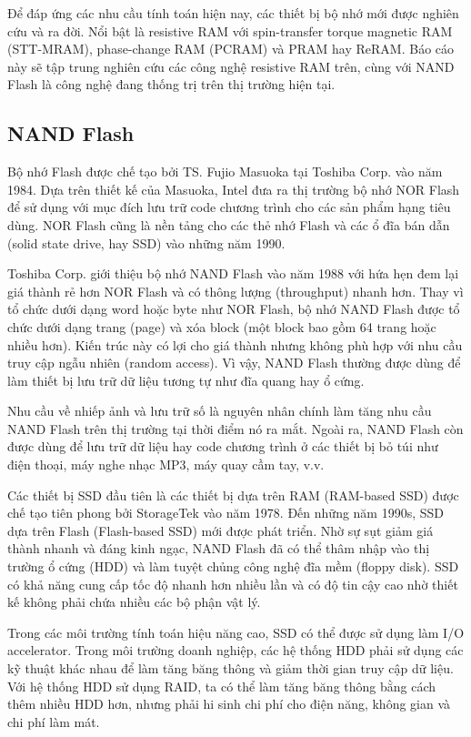 Để đáp ứng các nhu cầu tính toán hiện nay, các thiết bị bộ nhớ mới được nghiên
cứu và ra đời. Nổi bật là resistive RAM với spin-transfer torque magnetic RAM
(STT-MRAM), phase-change RAM (PCRAM) và PRAM hay ReRAM. Báo cáo này sẽ tập
trung nghiên cứu các công nghệ resistive RAM trên, cùng với NAND Flash là công
nghệ đang thống trị trên thị trường hiện tại.

\subsection{NAND Flash}
Bộ nhớ Flash được chế tạo bởi TS. Fujio Masuoka tại Toshiba Corp. vào năm 1984.
Dựa trên thiết kế của Masuoka, Intel đưa ra thị trường bộ nhớ NOR Flash để sử
dụng với mục đích lưu trữ code chương trình cho các sản phẩm hạng tiêu dùng.
NOR Flash cũng là nền tảng cho các thẻ nhớ Flash và các ổ đĩa bán dẫn (solid
state drive, hay SSD) vào những năm 1990.

Toshiba Corp. giới thiệu bộ nhớ NAND Flash vào năm 1988 với hứa hẹn đem lại giá
thành rẻ hơn NOR Flash và có thông lượng (throughput) nhanh hơn. Thay vì tổ
chức dưới dạng word hoặc byte như NOR Flash, bộ nhớ NAND Flash được tổ chức
dưới dạng trang (page) và xóa block (một block bao gồm 64 trang hoặc nhiều
hơn). Kiến trúc này có lợi cho giá thành nhưng không phù hợp với nhu cầu truy
cập ngẫu nhiên (random access). Vì vậy, NAND Flash thường được dùng để làm
thiết bị lưu trữ dữ liệu tương tự như đĩa quang hay ổ cứng.


Nhu cầu về nhiếp ảnh và lưu trữ số là nguyên nhân chính làm tăng nhu cầu NAND
Flash trên thị trường tại thời điểm nó ra mắt. Ngoài ra, NAND Flash còn được
dùng để lưu trữ dữ liệu hay code chương trình ở các thiết bị bỏ túi như điện
thoại, máy nghe nhạc MP3, máy quay cầm tay, v.v.

Các thiết bị SSD đầu tiên là các thiết bị dựa trên RAM (RAM-based SSD) được chế
tạo tiên phong bởi StorageTek vào năm 1978. Đến những năm 1990s, SSD dựa trên
Flash (Flash-based SSD) mới được phát triển. Nhờ sự sụt giảm giá thành nhanh và
đáng kinh ngạc, NAND Flash đã có thể thâm nhập vào thị trường ổ cứng (HDD) và
làm tuyệt chủng công nghệ đĩa mềm (floppy disk). SSD có khả năng cung cấp tốc
độ nhanh hơn nhiều lần và có độ tin cậy cao nhờ thiết kế không phải chứa nhiều
các bộ phận vật lý.

Trong các môi trường tính toán hiệu năng cao, SSD có thể được sử dụng làm I/O
accelerator. Trong môi trường doanh nghiệp, các hệ thống HDD phải sử dụng các
kỹ thuật khác nhau để làm tăng băng thông và giảm thời gian truy cập dữ liệu.
Với hệ thống HDD sử dụng RAID, ta có thể làm tăng băng thông bằng cách thêm
nhiều HDD hơn, nhưng phải hi sinh chi phí cho điện năng, không gian và chi phí
làm mát.

